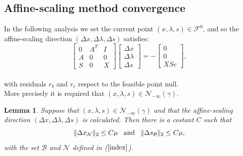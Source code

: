 \documentclass[a4paper,10 pt,titlepage,twoside]{book}
\theoremstyle{plain}
\newtheorem{lem}[thm]{Lemma}
\theoremstyle{definition}
\theoremstyle{remark}
\begin{document}
\subsection{Affine-scaling method convergence}
In the following analysis we set the current point $(x, \lambda, s)\in\mathcal{F}^{0}$, and so the affine-scaling direction $(\Delta x, \Delta \lambda, \Delta s)$ satisfies:\\
\begin{equation}\label{5.1}\tag{4.8}
\begin{bmatrix}
0&A^{T}&I \\A&0&0\\S&0&X
\end{bmatrix}\begin{bmatrix}
\Delta x\\\Delta\lambda \\\Delta s
\end{bmatrix}=-\begin{bmatrix}
0\\0\\XSe
\end{bmatrix},
\end{equation}\\
with residuals $r_{b}$ and $r_{c}$ respect to the feasible point null.\\More precisely it is required that $(x, \lambda, s)\in\mathcal{N}_{- \infty}(\gamma)$.
\begin{lem}
	Suppose that $(x, \lambda, s)\in\mathcal{N}_{- \infty}(\gamma)$ and that the affine-scaling direction $(\Delta x,\Delta \lambda, \Delta s)$ is calculated. Then there is a costant $C$ such that
	\begin{equation*}
	\lVert \Delta x_{\mathcal{N}} \rVert_{2} \leq C \mu \text{\;\;\;and\;\;\;} \lVert \Delta s_\mathcal{B} \rVert_{2} \leq C \mu,
	\end{equation*}
	with the set $\mathcal{B}$ and  $\mathcal{N}$ defined in ($\ref{index}$). 
\end{lem}
\end{document}
